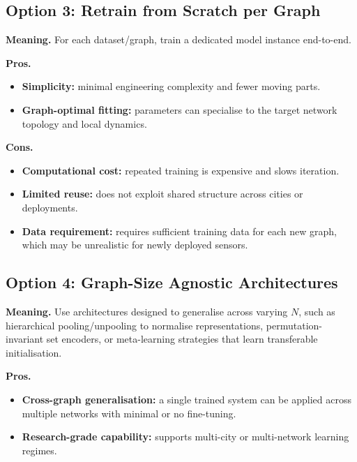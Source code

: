 \subsection{Option 3: Retrain from Scratch per Graph}
\label{subsec:appendix-option3-scratch}

\textbf{Meaning.} For each dataset/graph, train a dedicated model instance end-to-end.

\textbf{Pros.}
\begin{itemize}
    \item \textbf{Simplicity:} minimal engineering complexity and fewer moving parts.
    \item \textbf{Graph-optimal fitting:} parameters can specialise to the target network topology and local dynamics.
\end{itemize}

\textbf{Cons.}
\begin{itemize}
    \item \textbf{Computational cost:} repeated training is expensive and slows iteration.
    \item \textbf{Limited reuse:} does not exploit shared structure across cities or deployments.
    \item \textbf{Data requirement:} requires sufficient training data for each new graph, which may be unrealistic for newly deployed sensors.
\end{itemize}

\subsection{Option 4: Graph-Size Agnostic Architectures}
\label{subsec:appendix-option4-meta}

\textbf{Meaning.} Use architectures designed to generalise across varying $N$, such as hierarchical pooling/unpooling to normalise representations, permutation-invariant set encoders, or meta-learning strategies that learn transferable initialisation.

\textbf{Pros.}
\begin{itemize}
    \item \textbf{Cross-graph generalisation:} a single trained system can be applied across multiple networks with minimal or no fine-tuning.
    \item \textbf{Research-grade capability:} supports multi-city or multi-network learning regimes.
\end{itemize}

